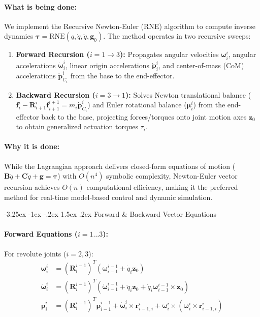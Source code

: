 \documentclass[11pt, a4paper]{article}
\makeatletter
\renewcommand{\subsection}{\@startsection{subsection}{2}{\z@}%
    {-3.25ex \@plus -1ex \@minus -.2ex}%
    {1.5ex \@plus .2ex}%
    {\normalfont\large\bfseries\color{brandaccent}}}
\makeatother
\begin{document}
\paragraph{What is being done:}
We implement the Recursive Newton-Euler (RNE) algorithm to compute inverse dynamics $\boldsymbol{\tau} = \text{RNE}(q, \dot{q}, \ddot{q}, \mathbf{g}_0)$. The method operates in two recursive sweeps:
\begin{enumerate}[leftmargin=1.5em]
    \item \textbf{Forward Recursion ($i = 1 \to 3$):} Propagates angular velocities $\boldsymbol{\omega}_i^i$, angular accelerations $\dot{\boldsymbol{\omega}}_i^i$, linear origin accelerations $\dot{\mathbf{p}}_i^i$, and center-of-mass (CoM) accelerations $\dot{\mathbf{p}}_{C_i}^i$ from the base to the end-effector.
    \item \textbf{Backward Recursion ($i = 3 \to 1$):} Solves Newton translational balance ($\mathbf{f}_i^i - \mathbf{R}_{i+1}^i \mathbf{f}_{i+1}^{i+1} = m_i \dot{\mathbf{p}}_{C_i}^i$) and Euler rotational balance ($\boldsymbol{\mu}_i^i$) from the end-effector back to the base, projecting forces/torques onto joint motion axes $\mathbf{z}_0$ to obtain generalized actuation torques $\tau_i$.
\end{enumerate}

\paragraph{Why it is done:}
While the Lagrangian approach delivers closed-form equations of motion ($\mathbf{B}\ddot{q} + \mathbf{C}\dot{q} + \mathbf{g} = \boldsymbol{\tau}$) with $O(n^4)$ symbolic complexity, Newton-Euler vector recursion achieves $O(n)$ computational efficiency, making it the preferred method for real-time model-based control and dynamic simulation.

\subsection{Forward \& Backward Vector Equations}
\paragraph{Forward Equations ($i = 1 \dots 3$):}
For revolute joints ($i = 2, 3$):
\begin{align}
    \boldsymbol{\omega}_i^i &= (\mathbf{R}_i^{i-1})^T (\boldsymbol{\omega}_{i-1}^{i-1} + \dot{q}_i \mathbf{z}_0) \\
    \dot{\boldsymbol{\omega}}_i^i &= (\mathbf{R}_i^{i-1})^T (\dot{\boldsymbol{\omega}}_{i-1}^{i-1} + \ddot{q}_i \mathbf{z}_0 + \dot{q}_i \boldsymbol{\omega}_{i-1}^{i-1} \times \mathbf{z}_0) \\
    \dot{\mathbf{p}}_i^i &= (\mathbf{R}_i^{i-1})^T \dot{\mathbf{p}}_{i-1}^{i-1} + \dot{\boldsymbol{\omega}}_i^i \times \mathbf{r}_{i-1,i}^i + \boldsymbol{\omega}_i^i \times (\boldsymbol{\omega}_i^i \times \mathbf{r}_{i-1,i}^i)
\end{align}
\end{document}
